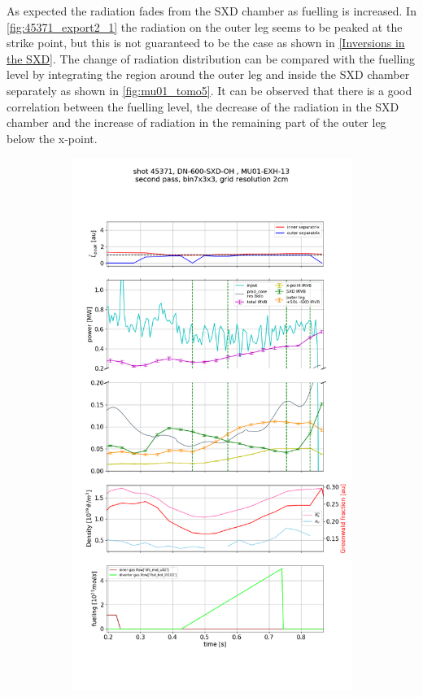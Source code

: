 As expected the radiation fades from the SXD chamber as fuelling is increased. In \autoref{fig:45371_export2_1} the radiation on the outer leg seems to be peaked at the strike point, but this is not guaranteed to be the case as shown in \autoref{Inversions in the SXD}. The change of radiation distribution can be compared with the fuelling level by integrating the region around the outer leg and inside the SXD chamber separately as shown in \autoref{fig:mu01_tomo5}. It can be observed that there is a good correlation between the fuelling level, the decrease of the radiation in the SXD chamber and the increase of radiation in the remaining part of the outer leg below the x-point.

\begin{figure}[!ht]
     \centering
     \begin{subfigure}{0.8\linewidth}
         \centering
         \includegraphics[trim={0 555 0 310},clip,width=\textwidth]{Chapters/chapter2/figs/IRVB-MASTU_shot-45371_pass1_bin7x3x3_gridres2cm_all_variables_absolute_small4.png}

\end{subfigure}
\end{figure}
